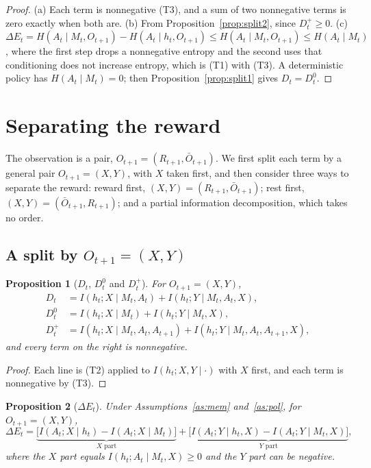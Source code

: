 \documentclass{article}
\newtheorem{proposition}{Proposition}[section]
\theoremstyle{definition}
\theoremstyle{remark}
\newcommand{\dE}{\Delta E}
\newcommand{\Ob}{\bar O}
\begin{document}
\begin{proof}
(a) Each term is nonnegative (T3), and a sum of two nonnegative terms is zero exactly when both are. (b) From Proposition~\ref{prop:split2}, since $D^+_t\ge0$. (c) $\dE_t=H(A_t\mid M_t,O_{t+1})-H(A_t\mid h_t,O_{t+1})\le H(A_t\mid M_t,O_{t+1})\le H(A_t\mid M_t)$, where the first step drops a nonnegative entropy and the second uses that conditioning does not increase entropy, which is (T1) with (T3). A deterministic policy has $H(A_t\mid M_t)=0$; then Proposition~\ref{prop:split1} gives $D_t=D^0_t$.
\end{proof}

\section{Separating the reward}\label{sec:reward}

The observation is a pair, $O_{t+1}=(R_{t+1},\Ob_{t+1})$. We first split each term by a general pair $O_{t+1}=(X,Y)$, with $X$ taken first, and then consider three ways to separate the reward: reward first, $(X,Y)=(R_{t+1},\Ob_{t+1})$; rest first, $(X,Y)=(\Ob_{t+1},R_{t+1})$; and a partial information decomposition, which takes no order.

\subsection{A split by $O_{t+1}=(X,Y)$}

\begin{proposition}[$D_t$, $D^0_t$ and $D^+_t$]\label{prop:xy-D}
For $O_{t+1}=(X,Y)$,
\begin{align*}
D_t&=I(h_t;X\mid M_t,A_t)+I(h_t;Y\mid M_t,A_t,X),\\
D^0_t&=I(h_t;X\mid M_t)+I(h_t;Y\mid M_t,X),\\
D^+_t&=I(h_t;X\mid M_t,A_t,A_{t+1})+I(h_t;Y\mid M_t,A_t,A_{t+1},X),
\end{align*}
and every term on the right is nonnegative.
\end{proposition}

\begin{proof}
Each line is (T2) applied to $I(h_t;X,Y\mid\cdot)$ with $X$ first, and each term is nonnegative by (T3).
\end{proof}

\begin{proposition}[$\dE_t$]\label{prop:xy-E}
Under Assumptions~\ref{as:mem} and~\ref{as:pol}, for $O_{t+1}=(X,Y)$,
\[
\dE_t=\underbrace{\big[I(A_t;X\mid h_t)-I(A_t;X\mid M_t)\big]}_{X\text{ part}}+\underbrace{\big[I(A_t;Y\mid h_t,X)-I(A_t;Y\mid M_t,X)\big]}_{Y\text{ part}},
\]
where the $X$ part equals $I(h_t;A_t\mid M_t,X)\ge0$ and the $Y$ part can be negative.
\end{proposition}
\end{document}
